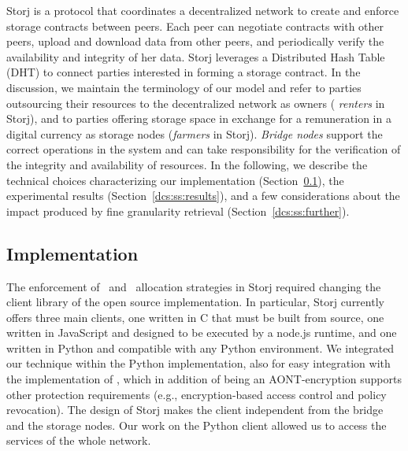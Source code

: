 Storj is a protocol that coordinates a decentralized network to create
and enforce storage contracts between peers. Each peer can negotiate
contracts with other peers, upload and download data from other peers,
and periodically verify the availability and integrity of her data.
Storj leverages a Distributed Hash Table (DHT) to connect parties
interested in forming a storage contract.  In the discussion, we
maintain the terminology of our model and refer to parties outsourcing
their resources to the decentralized network as owners ({\em
  renters\/} in Storj), and to parties offering storage space in
exchange for a remuneration in a digital currency as storage nodes
({\em farmers\/} in Storj).  {\em Bridge nodes\/} support the correct
operations in the system and can take responsibility for the
verification of the integrity and availability of resources. In the
following, we describe the technical choices characterizing our
implementation (Section~\ref{dcs:ss:implementation}), the experimental
results (Section~\ref{dcs:ss:results}), and a few considerations about the
impact produced by fine granularity retrieval (Section~\ref{dcs:ss:further}).
    

\subsection{Implementation}\label{dcs:ss:implementation}
The enforcement of \diagonal\ and \compact\ allocation strategies in
Storj required changing the client library of the open source
implementation.  In particular, Storj currently offers three main
clients, one written in C that must be built from source, one written
in JavaScript and designed to be executed by a node.js runtime, and
one written in Python and compatible with any Python environment. We
integrated our technique within the Python implementation, also for
easy integration with the implementation of \name, which in addition
of being an AONT-encryption supports other protection requirements
(e.g., encryption-based access control and policy revocation).  The
design of Storj makes the client independent from the bridge and the
storage nodes. Our work on the Python client allowed us to access the
services of the whole network.

